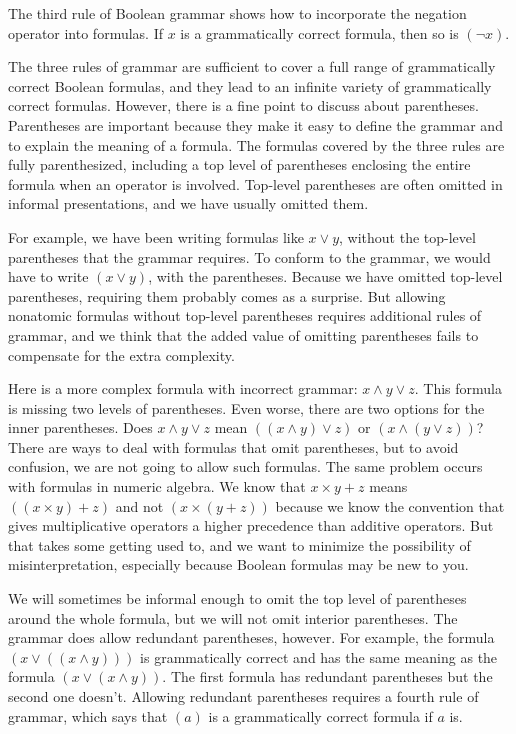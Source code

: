 The third rule of Boolean grammar shows
how to incorporate the negation operator into formulas.
If $x$ is a grammatically correct formula, then so is $(\neg x)$.

The three rules of grammar are sufficient to
cover a full range of grammatically correct Boolean formulas,
and they lead to an infinite variety of grammatically correct formulas.
However, there is a fine point to discuss about parentheses.
Parentheses are important because they make it easy to define
the grammar and to explain the meaning of a formula.
The formulas covered by the three rules are fully parenthesized,
including a top level of parentheses enclosing the entire formula
when an operator is involved.
Top-level parentheses are often omitted in informal presentations,
and we have usually omitted them.

For example, we have been writing formulas like $x \vee y$,
without the top-level parentheses
that the grammar requires.
To conform to the grammar,
we would have to write $(x \vee y)$, with the parentheses.
Because we have omitted top-level parentheses,
requiring them probably comes as a surprise.
But allowing nonatomic formulas without top-level parentheses
requires additional rules of grammar,
and we think that the added value of omitting parentheses
fails to compensate for the extra complexity.

Here is a more complex formula with incorrect grammar:
$x \wedge y \vee z$. This formula is missing two levels of parentheses.
Even worse, there are two options for the inner parentheses.
Does $x \wedge y \vee z$ mean $((x \wedge y) \vee z)$ or $(x \wedge (y \vee z))$?
There are ways to deal with formulas that omit parentheses,
but to avoid confusion, we are not going to allow such formulas.
The same problem occurs with formulas in numeric algebra.
We know that $x \times y + z$ means $((x \times y) + z)$ and
not $(x \times (y + z))$ because we know the convention that
gives multiplicative operators a higher precedence than additive operators.
But that takes some getting used to, and we want to
minimize the possibility of misinterpretation,
especially because Boolean formulas may be new to you.

We will sometimes be informal enough to omit the
top level of parentheses around the whole formula,
but we will not omit interior parentheses.
The grammar does allow redundant parentheses, however.
For example, the formula $(x \vee ((x \wedge y)))$
is grammatically correct and has the same meaning as the formula
$(x \vee (x \wedge y))$.
The first formula has redundant parentheses
but the second one doesn't.
Allowing redundant parentheses requires a fourth rule of grammar,
which says that $(a)$ is a grammatically correct formula
if $a$ is.

